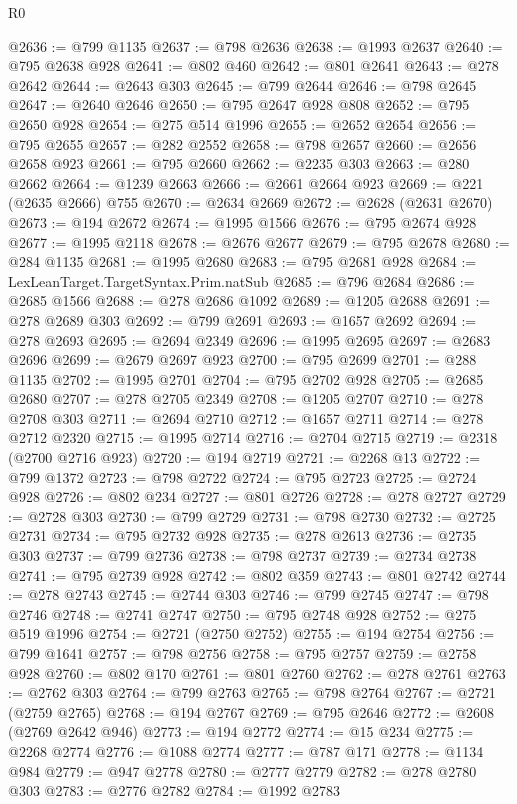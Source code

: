 \begin{lexlean}{R0}
\begin{coremodule}
@2636 := @799 @1135
@2637 := @798 @2636
@2638 := @1993 @2637
@2640 := @795 @2638 @928
@2641 := @802 @460
@2642 := @801 @2641
@2643 := @278 @2642
@2644 := @2643 @303
@2645 := @799 @2644
@2646 := @798 @2645
@2647 := @2640 @2646
@2650 := @795 @2647 @928 @808
@2652 := @795 @2650 @928
@2654 := @275 @514 @1996
@2655 := @2652 @2654
@2656 := @795 @2655
@2657 := @282 @2552
@2658 := @798 @2657
@2660 := @2656 @2658 @923
@2661 := @795 @2660
@2662 := @2235 @303
@2663 := @280 @2662
@2664 := @1239 @2663
@2666 := @2661 @2664 @923
@2669 := @221 (@2635 @2666) @755
@2670 := @2634 @2669
@2672 := @2628 (@2631 @2670)
@2673 := @194 @2672
@2674 := @1995 @1566
@2676 := @795 @2674 @928
@2677 := @1995 @2118
@2678 := @2676 @2677
@2679 := @795 @2678
@2680 := @284 @1135
@2681 := @1995 @2680
@2683 := @795 @2681 @928
@2684 := LexLeanTarget.TargetSyntax.Prim.natSub
@2685 := @796 @2684
@2686 := @2685 @1566
@2688 := @278 @2686 @1092
@2689 := @1205 @2688
@2691 := @278 @2689 @303
@2692 := @799 @2691
@2693 := @1657 @2692
@2694 := @278 @2693
@2695 := @2694 @2349
@2696 := @1995 @2695
@2697 := @2683 @2696
@2699 := @2679 @2697 @923
@2700 := @795 @2699
@2701 := @288 @1135
@2702 := @1995 @2701
@2704 := @795 @2702 @928
@2705 := @2685 @2680
@2707 := @278 @2705 @2349
@2708 := @1205 @2707
@2710 := @278 @2708 @303
@2711 := @2694 @2710
@2712 := @1657 @2711
@2714 := @278 @2712 @2320
@2715 := @1995 @2714
@2716 := @2704 @2715
@2719 := @2318 (@2700 @2716 @923)
@2720 := @194 @2719
@2721 := @2268 @13
@2722 := @799 @1372
@2723 := @798 @2722
@2724 := @795 @2723
@2725 := @2724 @928
@2726 := @802 @234
@2727 := @801 @2726
@2728 := @278 @2727
@2729 := @2728 @303
@2730 := @799 @2729
@2731 := @798 @2730
@2732 := @2725 @2731
@2734 := @795 @2732 @928
@2735 := @278 @2613
@2736 := @2735 @303
@2737 := @799 @2736
@2738 := @798 @2737
@2739 := @2734 @2738
@2741 := @795 @2739 @928
@2742 := @802 @359
@2743 := @801 @2742
@2744 := @278 @2743
@2745 := @2744 @303
@2746 := @799 @2745
@2747 := @798 @2746
@2748 := @2741 @2747
@2750 := @795 @2748 @928
@2752 := @275 @519 @1996
@2754 := @2721 (@2750 @2752)
@2755 := @194 @2754
@2756 := @799 @1641
@2757 := @798 @2756
@2758 := @795 @2757
@2759 := @2758 @928
@2760 := @802 @170
@2761 := @801 @2760
@2762 := @278 @2761
@2763 := @2762 @303
@2764 := @799 @2763
@2765 := @798 @2764
@2767 := @2721 (@2759 @2765)
@2768 := @194 @2767
@2769 := @795 @2646
@2772 := @2608 (@2769 @2642 @946)
@2773 := @194 @2772
@2774 := @15 @234
@2775 := @2268 @2774
@2776 := @1088 @2774
@2777 := @787 @171
@2778 := @1134 @984
@2779 := @947 @2778
@2780 := @2777 @2779
@2782 := @278 @2780 @303
@2783 := @2776 @2782
@2784 := @1992 @2783

\end{coremodule}
\end{lexlean}
